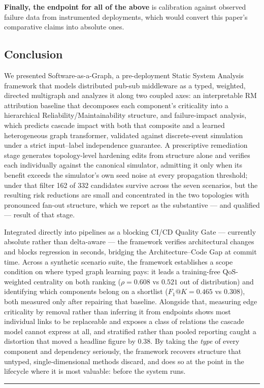 \textbf{Finally, the endpoint for all of the above} is calibration against observed failure data from
instrumented deployments, which would convert this paper's comparative claims into absolute ones.

\hypertarget{conclusion}{%
\subsection{Conclusion}\label{conclusion}}

\label{sec:9.4}

We presented Software-as-a-Graph, a pre-deployment Static System Analysis framework that models
distributed pub-sub middleware as a typed, weighted, directed multigraph and analyzes it along two
coupled axes: an interpretable RM attribution baseline that decomposes each component's criticality
into a hierarchical Reliability/Maintainability structure, and failure-impact analysis, which predicts cascade impact with both that
composite and a learned heterogeneous graph transformer, validated against discrete-event simulation
under a strict input--label independence guarantee. A prescriptive remediation stage generates
topology-level hardening edits from structure alone and verifies each individually against the
canonical simulator, admitting it only when its benefit exceeds the simulator's own seed noise at
every propagation threshold; under that filter 162 of 332 candidates survive across the seven
scenarios, but the resulting risk reductions are small and concentrated in the two topologies with
pronounced fan-out structure, which we report as the substantive --- and qualified --- result of that
stage.

Integrated directly into pipelines as a blocking CI/CD Quality Gate --- currently absolute rather
than delta-aware --- the framework verifies architectural changes and blocks regression in seconds,
bridging the Architecture--Code Gap at commit time. Across a synthetic scenario suite, the framework
establishes a scope condition on where typed graph learning pays: it leads a training-free
QoS-weighted centrality on both ranking (\(\rho=0.608\) vs \(0.521\) out of distribution) and
identifying which components belong on a shortlist (\(F_1@K=0.465\) vs \(0.308\)), both measured only
after repairing that baseline. Alongside that, measuring edge criticality by removal rather than
inferring it from endpoints shows most individual links to be replaceable and exposes a class of
relations the cascade model cannot express at all, and stratified rather than pooled reporting caught
a distortion that moved a headline figure by 0.38. By taking the \emph{type} of every component and
dependency seriously, the framework recovers structure that untyped, single-dimensional methods
discard, and does so at the point in the lifecycle where it is most valuable: before the system runs.

\begin{center}\rule{0.5\linewidth}{0.5pt}\end{center}
